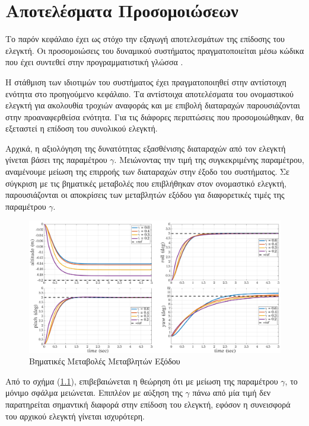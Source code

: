 \chapter{Αποτελέσματα Προσομοιώσεων}
Το παρόν κεφάλαιο έχει ως στόχο την εξαγωγή αποτελεσμάτων της επίδοσης του
ελεγκτή. Οι προσομοιώσεις του δυναμικού συστήματος πραγματοποιείται μέσω κώδικα 
που έχει συντεθεί στην προγραμματιστική γλώσσα .

Η στάθμιση των ιδιοτιμών του συστήματος έχει πραγματοποιηθεί στην αντίστοιχη 
ενότητα στο προηγούμενο κεφάλαιο. Τα αντίστοιχα αποτελέσματα του ονομαστικού 
ελεγκτή για ακολουθία τροχιών αναφοράς και με επιβολή διαταραχών παρουσιάζονται 
στην προαναφερθείσα ενότητα. Για τις διάφορες περιπτώσεις που προσομοιώθηκαν, θα
εξεταστεί η επίδοση του συνολικού ελεγκτή.

Αρχικά, η αξιολόγηση της δυνατότητας εξασθένισης διαταραχών από τον ελεγκτή 
γίνεται βάσει της παραμέτρου $\gamma$. Μειώνοντας την τιμή της συγκεκριμένης 
παραμέτρου, αναμένουμε μείωση της επιρροής των διαταραχών στην έξοδο του 
συστήματος. Σε σύγκριση με τις βηματικές μεταβολές που επιβλήθηκαν στον 
ονομαστικό ελεγκτή, παρουσιάζονται οι αποκρίσεις των μεταβλητών εξόδου για 
διαφορετικές τιμές της παραμέτρου $\gamma$.

\begin{figure}[htb!]
    \centering
    \includegraphics[width=1\textwidth]{Results/step_resp_gamma.png}
    \caption{Βηματικές Μεταβολές Μεταβλητών Εξόδου}
    \label{fig:step_d}
\end{figure}
Από το σχήμα (\ref{fig:step_d}), επιβεβαιώνεται η θεώρηση ότι με μείωση της 
παραμέτρου $\gamma$, το μόνιμο σφάλμα μειώνεται. Επιπλέον με αύξηση της $\gamma$
πάνω από μία τιμή δεν παρατηρείται σημαντική διαφορά στην επίδοση του ελεγκτή, 
εφόσον η συνεισφορά του αρχικού ελεγκτή γίνεται ισχυρότερη.


